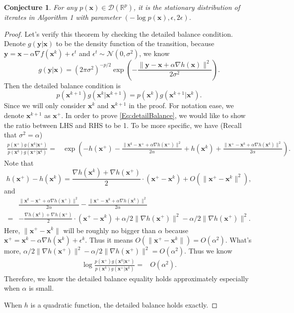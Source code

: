 \documentclass[preprint,12pt,3p]{elsarticle}
\newcommand{\bx}{\mathbf{x}}
\newcommand{\R}{\mathbb{R}}
\newcommand{\D}{\mathscr{D}}
\newcommand{\N}{\mathscr{N}}
\newcommand{\by}{\mathbf{y}}
\newtheorem{conjecture}{Conjecture}
\begin{document}
\begin{conjecture}
For any $p(\bx)\in \D(\R^p)$, it is the stationary distribution of iterates in Algorithm 1 with parameter $(-\log p(\bx), \epsilon, 2\epsilon)$.
\end{conjecture}
\begin{proof}
Let's verify this theorem by checking the detailed balance condition. Denote $g(\by|\bx)$ to be the density function of the transition, because $\by = \bx - \alpha \nabla f(\bx^k) + \epsilon^t$ and $\epsilon^t\sim \N(0, \sigma^2)$, we know
\begin{equation}
g(\by|\bx) = (2\pi \sigma^2)^{-p/2} \exp(- \frac{\|\by - \bx + \alpha \nabla h(\bx)\|^2}{2\sigma^2}).
\end{equation}
Then the detailed balance condition is
\begin{equation}\label{Eq:detailBalance}
p(\bx^{k+1}) g(\bx^{k}|\bx^{k+1}) = p(\bx^{k}) g(\bx^{k+1}|\bx^{k}).
\end{equation}
Since we will only consider $\bx^k$ and $\bx^{k+1}$ in the proof. For notation ease, we denote $\bx^{k+1}$ as $\bx^+$.
In order to prove \ref{Eq:detailBalance}, we would like to show the ratio between LHS and RHS to be 1. To be more specific, we have (Recall that $\sigma^2 = \alpha$)
\begin{eqnarray}
\frac{p(\bx^{+}) g(\bx^{k}|\bx^{+})}{p(\bx^{k}) g(\bx^{+}|\bx^{k})} = & \exp(-h(\bx^{+}) - \frac{\|\bx^{k} - \bx^+ + \alpha \nabla h(\bx^{+})\|^2}{2\alpha} + h(\bx^{k}) + \frac{\|\bx^{+} - \bx^k + \alpha \nabla h(\bx^k)\|^2}{2\alpha}).
\end{eqnarray}
Note that
\[h(\bx^+) - h(\bx^k) = \frac{\nabla h(\bx^k) + \nabla h(\bx^+)}{2} \cdot (\bx^+ - \bx^k) + O(\|\bx^+ - \bx^k\|^2),
\]
and
\begin{eqnarray}
 & \frac{\|\bx^{k} - \bx^+ + \alpha \nabla h(\bx^{+})\|^2}{2\alpha} - \frac{\|\bx^{+} - \bx^k + \alpha \nabla h(\bx^k)\|^2}{2\alpha} \\
 =& -\frac{\nabla h(\bx^k) + \nabla h(\bx^+)}{2} \cdot (\bx^+ - \bx^k) + \alpha/2 \|\nabla h(\bx^+)\|^2 - \alpha/2 \|\nabla h(\bx^+)\|^2.
\end{eqnarray}
Here, $\|\bx^+ - \bx^k\|$ will be roughly no bigger than $\alpha$ because $\bx^+ = \bx^k - \alpha \nabla h(\bx^k) + \epsilon^k$.  Thus it means $O(\|\bx^+ - \bx^k\|) = O(\alpha^2)$. What's more, $\alpha/2 \|\nabla h(\bx^+)\|^2 - \alpha/2 \|\nabla h(\bx^+)\|^2 = O(\alpha^2)$.
Thus we know
\begin{eqnarray}
\log \frac{p(\bx^{+}) g(\bx^{k}|\bx^{+})}{p(\bx^{k}) g(\bx^{+}|\bx^{k})} = &O(\alpha^2).
\end{eqnarray}
Therefore, we know the detailed balance equality holds approximately especially when $\alpha$ is small.

When $h$ is a quadratic function, the detailed balance holds exactly.
\end{proof}
\end{document}

